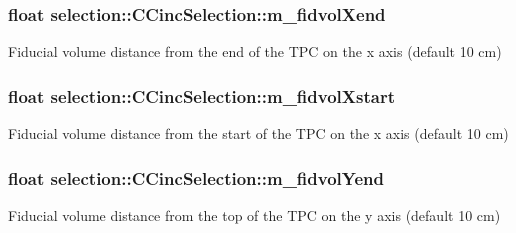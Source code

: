 \subsubsection[{\texorpdfstring{m\+\_\+fidvol\+Xend}{m_fidvolXend}}]{\setlength{\rightskip}{0pt plus 5cm}float selection\+::\+C\+Cinc\+Selection\+::m\+\_\+fidvol\+Xend\hspace{0.3cm}{\ttfamily [private]}}\hypertarget{classselection_1_1CCincSelection_ae4bab4cf8ea55e54fcdaa66d2fe44c1d}{}\label{classselection_1_1CCincSelection_ae4bab4cf8ea55e54fcdaa66d2fe44c1d}
Fiducial volume distance from the end of the T\+PC on the x axis (default 10 cm) 
\subsubsection[{\texorpdfstring{m\+\_\+fidvol\+Xstart}{m_fidvolXstart}}]{\setlength{\rightskip}{0pt plus 5cm}float selection\+::\+C\+Cinc\+Selection\+::m\+\_\+fidvol\+Xstart\hspace{0.3cm}{\ttfamily [private]}}\hypertarget{classselection_1_1CCincSelection_aab38faac4866d19339aadbc3ac1eb55b}{}\label{classselection_1_1CCincSelection_aab38faac4866d19339aadbc3ac1eb55b}
Fiducial volume distance from the start of the T\+PC on the x axis (default 10 cm) 
\subsubsection[{\texorpdfstring{m\+\_\+fidvol\+Yend}{m_fidvolYend}}]{\setlength{\rightskip}{0pt plus 5cm}float selection\+::\+C\+Cinc\+Selection\+::m\+\_\+fidvol\+Yend\hspace{0.3cm}{\ttfamily [private]}}\hypertarget{classselection_1_1CCincSelection_a01d6a0608356e4ea245f23e1b6934fd3}{}\label{classselection_1_1CCincSelection_a01d6a0608356e4ea245f23e1b6934fd3}
Fiducial volume distance from the top of the T\+PC on the y axis (default 10 cm) 
